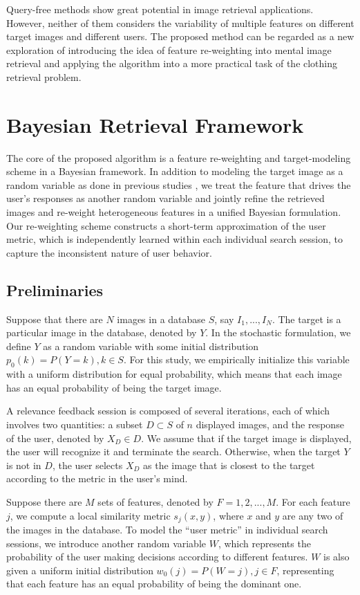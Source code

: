 \documentclass[journal]{IEEEtran}
\begin{document}
Query-free methods show great potential in image retrieval applications. However, neither of them considers the variability of multiple features on different target images and different users. The proposed method can be regarded as a new exploration of introducing the idea of feature re-weighting into mental image retrieval and applying the algorithm into a more practical task of the clothing retrieval problem.

\section{Bayesian Retrieval Framework}
\label{sec::algorithm}
The core of the proposed algorithm is a feature re-weighting and target-modeling scheme in a Bayesian framework. In addition to modeling the target image as a random variable as done in previous studies \cite{fang2005experiments,ferecatu2007interactive,suditu2012iterative}, we treat the feature that drives the user's responses as another random variable and jointly refine the retrieved images and re-weight heterogeneous features in a unified Bayesian formulation. Our re-weighting scheme constructs a short-term approximation of the user metric, which is independently learned within each individual search session, to capture the inconsistent nature of user behavior.

\subsection{Preliminaries}\label{subsec::preliminary}
Suppose that there are $N$ images in a database $S$, say $I_1,...,I_N$. The target is a particular image in the database, denoted by $Y$. In the stochastic formulation, we define $Y$ as a random variable with some initial distribution $p_0(k)=P(Y=k),k\in S$. For this study, we empirically initialize this variable with a uniform distribution for equal probability, which means that each image has an equal probability of being the target image.

A relevance feedback session is composed of several iterations, each of which involves two quantities: a subset $D\subset S$ of $n$ displayed images, and the response of the user, denoted by $X_D\in D$. We assume that if the target image is displayed, the user will recognize it and terminate the search. Otherwise, when the target $Y$ is not in $D$, the user selects $X_D$ as the image that is closest to the target according to the metric in the user's mind.

Suppose there are $M$ sets of features, denoted by $F=1,2,...,M$. For each feature $j$, we compute a local similarity metric $s_j(x,y)$, where $x$ and $y$ are any two of the images in the database. To model the ``user metric'' in individual search sessions, we introduce another random variable $W$, which represents the probability of the user making decisions according to different features. $W$ is also given a uniform initial distribution $w_0(j)=P(W=j),j\in F$, representing that each feature has an equal probability of being the dominant one.
\end{document}
